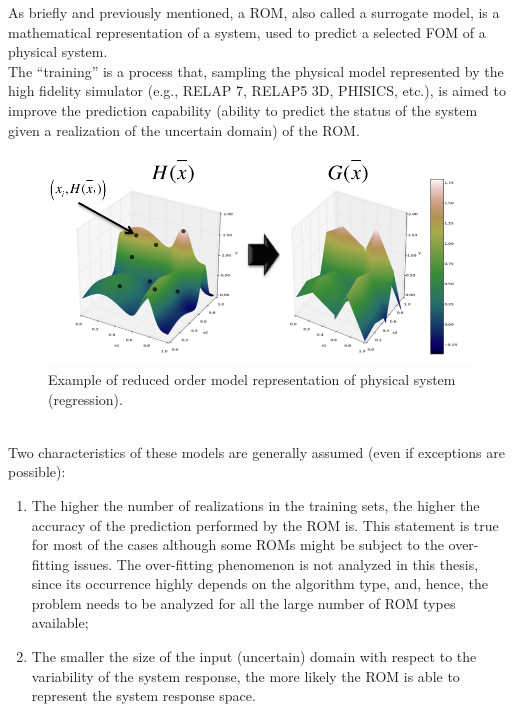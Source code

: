 As briefly and previously mentioned, a ROM, also called a surrogate 
model, is a mathematical representation of a system, used to predict 
a selected FOM of a physical system.
\\The ``training'' is a process that, sampling the physical model 
represented by the high fidelity simulator (e.g., RELAP 7, RELAP5 
3D, PHISICS, etc.), is aimed to improve the prediction capability 
(ability to predict the status of the system given a realization of the 
uncertain domain) of the ROM. 
\begin{figure}[h!]
  \centering
  \includegraphics[width=1.0\textwidth]  {pics/ROMexampleOfPhysicalSystem.png}
  \caption{Example of reduced order model representation of physical system (regression).}
  \label{fig:ROMexampleOfPhysicalSystem}
\end{figure}
\\Two characteristics of these models 
are generally assumed (even if exceptions are possible):
\begin{enumerate}
  \item The higher the number of realizations in the training sets, the 
higher the accuracy of the prediction performed by the ROM is. This 
statement is true for most of the cases although some ROMs might be 
subject to the over-fitting issues. The over-fitting phenomenon is not 
analyzed in this thesis, since its occurrence highly depends on the 
algorithm type, and, hence, the problem needs to be analyzed for all 
the large number of ROM types available;
  \item The smaller the size of the input (uncertain) domain with 
  respect to the variability of the system response, the more likely the 
  ROM is able to represent the system response space.
\end{enumerate}

